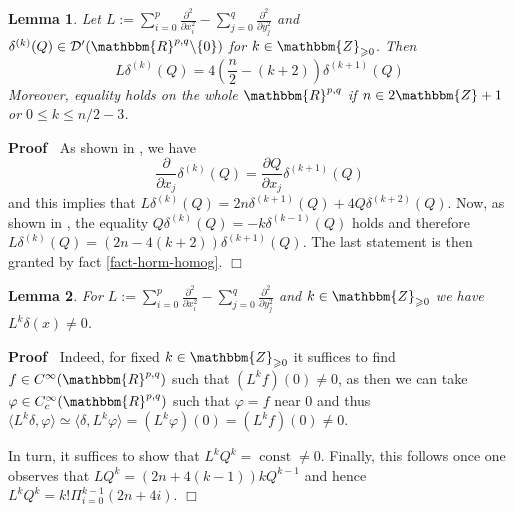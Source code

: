 \documentclass{article}
\newcommand{\assign}{:=}
\newcommand{\tmop}[1]{\ensuremath{\operatorname{#1}}}
\newenvironment{proof}{\noindent\textbf{Proof\ }}{\hspace*{\fill}$\Box$\medskip}
\numberwithin{definition}{section}
\newtheorem{lemma}{Lemma}
\numberwithin{lemma}{section}
\numberwithin{proposition}{section}
{\theorembodyfont{\rmfamily}\newtheorem{remark}{Remark}
\numberwithin{remark}{section}
}
\begin{document}
\begin{lemma}
  \label{lem-5}Let $L \assign \sum_{i = 0}^p \frac{\partial^2}{\partial x_i^2}
  - \sum_{j = 0}^q \frac{\partial^2}{\partial y_j^2}$ and $\delta^{( k)} ( Q)
  \in \mathcal{D}' ( \mathbbm{R}^{p, q} \backslash \{ 0 \})$ for $k \in
  \mathbbm{Z}_{\geqslant 0}$. Then
  \[ L \delta^{( k)} ( Q) = 4 \left( \frac{n}{2} - ( k + 2) \right) \delta^{(
     k + 1)} ( Q) \]
  Moreover, equality holds on the whole $\mathbbm{R}^{p, q}$ if $n \in
  2\mathbbm{Z}+ 1$ or $0 \leqslant k \leqslant n / 2 - 3$.
\end{lemma}

\begin{proof}
  As shown in {\cite[sec. III.1.6, eq. (1)]{gelfand1980distribution}}, we have
  \[ \frac{\partial}{\partial x_j} \delta^{( k)} ( Q) = \frac{\partial
     Q}{\partial x_j} \delta^{( k + 1)} ( Q) \]
  and this implies that $L \delta^{( k)} ( Q) = 2 n \delta^{( k + 1)} ( Q) + 4
  Q \delta^{( k + 2)} ( Q)$. Now, as shown in {\cite[sec. III.1.6, eq.
  (6)]{gelfand1980distribution}}, the equality $Q \delta^{( k)} ( Q) = - k
  \delta^{( k - 1)} ( Q)$ holds and therefore $L \delta^{( k)} ( Q) = ( 2 n -
  4 ( k + 2)) \delta^{( k + 1)} ( Q)$. The last statement is then granted by
  fact \ref{fact-horm-homog}.
\end{proof}

\begin{lemma}
  \label{lem-6}For $L \assign \sum_{i = 0}^p \frac{\partial^2}{\partial x_i^2}
  - \sum_{j = 0}^q \frac{\partial^2}{\partial y_j^2}$ and $k \in
  \mathbbm{Z}_{\geqslant 0}$ we have $L^k \delta ( x) \neq 0$.
\end{lemma}

\begin{proof}
  Indeed, for fixed $k \in \mathbbm{Z}_{\geqslant 0}$ it suffices to find $f
  \in C^{\infty} ( \mathbbm{R}^{p, q})$ such that $( L^k f) ( 0) \neq 0$, as
  then we can take $\varphi \in C_c^{\infty} ( \mathbbm{R}^{p, q})$ such that
  $\varphi = f$ near $0$ and thus $\langle L^k \delta, \varphi \rangle \simeq
  \langle \delta, L^k \varphi \rangle = ( L^k \varphi) ( 0) = ( L^k f) ( 0)
  \neq 0$.
  
  In turn, it suffices to show that $L^k Q^k = \tmop{const} \neq 0$. Finally,
  this follows once one observes that $L Q^k = ( 2 n + 4 ( k - 1)) k Q^{k -
  1}$ and hence $L^k Q^k = k! \Pi_{i = 0}^{k - 1} ( 2 n + 4 i)$.
\end{proof}
\end{document}
